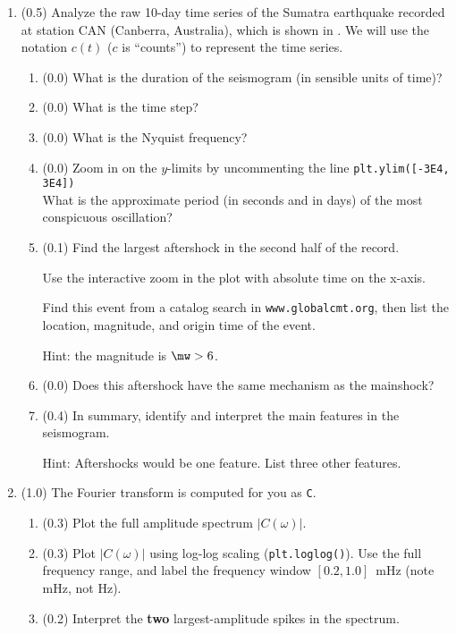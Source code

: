 \documentclass[11pt,titlepage,fleqn]{article}
\newcommand{\tfileresponse}{{\tt hw\_sumatraA\_CAN\_response.ipynb}}
\begin{document}
\begin{enumerate}



\item (0.5) Analyze the raw 10-day time series of the Sumatra earthquake recorded at station CAN (Canberra, Australia), which is shown in . We will use the notation $c(t)$ ($c$ is ``counts'') to represent the time series.

\begin{enumerate}
\item (0.0) What is the duration of the seismogram (in sensible units of time)?
\item (0.0) What is the time step?
\item (0.0) What is the Nyquist frequency?
\item (0.0) Zoom in on the $y$-limits by uncommenting the line \verb+plt.ylim([-3E4, 3E4])+ \\
What is the approximate period (in seconds and in days) of the most conspicuous oscillation?

\item (0.1) Find the largest aftershock in the second half of the record.

Use the interactive zoom in the plot with absolute time on the x-axis.

Find this event from a catalog search in \verb+www.globalcmt.org+, then list the location, magnitude, and origin time of the event.

Hint: the magnitude is $\mw > 6$.

\item (0.0) Does this aftershock have the same mechanism as the mainshock?
\item (0.4) In summary, identify and interpret the main features in the seismogram.

Hint: Aftershocks would be one feature. List three other features.
\end{enumerate}


\item (1.0) The Fourier transform is computed for you as \verb+C+.
\begin{enumerate}
\item (0.3) Plot the full amplitude spectrum $|C(\omega)|$.
\item (0.3) Plot $|C(\omega)|$ using log-log scaling (\verb+plt.loglog()+). Use the full frequency range, and label the frequency window $[0.2,1.0]$~mHz (note mHz, not Hz).
\item (0.2) Interpret the {\bf two} largest-amplitude spikes in the spectrum.


\end{enumerate}
\end{enumerate}
\end{document}
